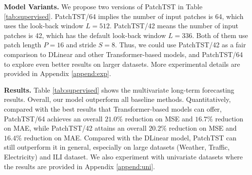 \documentclass{article} %
\begin{document}
\textbf{Model Variants.} We propose two versions of PatchTST in Table \ref{tab:supervised}. PatchTST/64 implies the number of input patches is 64, which uses the look-back window $L=512$. PatchTST/42 means the number of input patches is 42, which has the default look-back window $L=336$. Both of them use patch length $P=16$ and stride $S=8$. Thus, we could use PatchTST/42 as a fair comparison to DLinear and other Transformer-based models, and PatchTST/64 to explore even better results on larger datasets. More experimental details are provided in Appendix \ref{append:exp}.

\textbf{Results.} Table \ref{tab:supervised} shows the multivariate long-term forecasting results. Overall, our model outperform all baseline methods. Quantitatively, compared with the best results that Transformer-based models can offer, PatchTST/64 achieves an overall $\mathbf{21.0\%}$ reduction on MSE and $\mathbf{16.7\%}$ reduction on MAE, while PatchTST/42 attains an overall $\mathbf{20.2\%}$ reduction on MSE and $\mathbf{16.4\%}$ reduction on MAE. Compared with the DLinear model, PatchTST can still outperform it in general, especially on large datasets (Weather, Traffic, Electricity) and ILI dataset. We also experiment with univariate datasets where the results are provided in Appendix \ref{append:uni}. 
\end{document}
